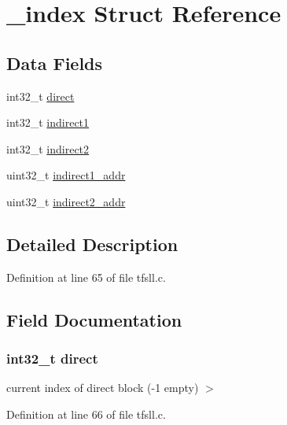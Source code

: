 \hypertarget{struct__index}{}\section{\+\_\+index Struct Reference}
\label{struct__index}
\subsection*{Data Fields}
\begin{DoxyCompactItemize}
\item 
int32\+\_\+t \hyperlink{struct__index_a5a574bc8bf3d2809a6134ba491478e13}{direct}
\item 
int32\+\_\+t \hyperlink{struct__index_ab88ea15eb565a4f84685a02f5fbda9e5}{indirect1}
\item 
int32\+\_\+t \hyperlink{struct__index_a26bb3bd357a55d414a7215c0be38f7a5}{indirect2}
\item 
uint32\+\_\+t \hyperlink{struct__index_aebf2ea5d23f0b87754b15a441ae254f7}{indirect1\+\_\+addr}
\item 
uint32\+\_\+t \hyperlink{struct__index_a61003972ea04afde63442341b23aa31c}{indirect2\+\_\+addr}
\end{DoxyCompactItemize}


\subsection{Detailed Description}


Definition at line 65 of file tfsll.\+c.



\subsection{Field Documentation}
\hypertarget{struct__index_a5a574bc8bf3d2809a6134ba491478e13}{}
\subsubsection[{direct}]{\setlength{\rightskip}{0pt plus 5cm}int32\+\_\+t direct}\label{struct__index_a5a574bc8bf3d2809a6134ba491478e13}
current index of direct block (-\/1 empty) $>$ 

Definition at line 66 of file tfsll.\+c.

\hypertarget{struct__index_ab88ea15eb565a4f84685a02f5fbda9e5}{}
